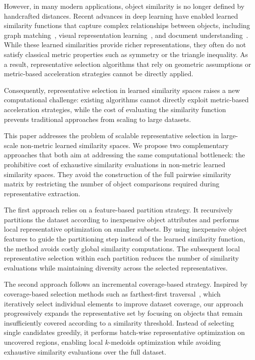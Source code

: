 \documentclass{ieeeaccess}
\begin{document}
However, in many modern applications, object similarity is no longer defined by handcrafted distances. Recent advances in deep learning have enabled learned similarity functions that capture complex relationships between objects, including graph matching~\cite{li2019graphmatchingnetworkslearning}, visual representation learning~\cite{chen2020simpleframeworkcontrastivelearning}, and document understanding~\cite{xu2020layoutlm}. While these learned similarities provide richer representations, they often do not satisfy classical metric properties such as symmetry or the triangle inequality. As a result, representative selection algorithms that rely on geometric assumptions or metric-based acceleration strategies cannot be directly applied.

Consequently, representative selection in learned similarity spaces raises a new computational challenge: existing algorithms cannot directly exploit metric-based acceleration strategies, while the cost of evaluating the similarity function prevents traditional approaches from scaling to large datasets.


This paper addresses the problem of scalable representative selection in large-scale non-metric learned similarity spaces. We propose two complementary approaches that both aim at addressing the same computational bottleneck: the prohibitive cost of exhaustive similarity evaluations in non-metric learned similarity spaces. They avoid the construction of the full pairwise similarity matrix by restricting the number of object comparisons required during representative extraction.

The first approach relies on a feature-based partition strategy. It recursively partitions the dataset according to inexpensive object attributes and performs local representative optimization on smaller subsets. By using inexpensive object features to guide the partitioning step instead of the learned similarity function, the method avoids costly global similarity computations. The subsequent local representative selection within each partition reduces the number of similarity evaluations while maintaining diversity across the selected representatives.

The second approach follows an incremental coverage-based strategy. Inspired by coverage-based selection methods such as farthest-first traversal~\cite{gonzalez1985clustering}, which iteratively select individual elements to improve dataset coverage, our approach progressively expands the representative set by focusing on objects that remain insufficiently covered according to a similarity threshold. Instead of selecting single candidates greedily, it performs batch-wise representative optimization on uncovered regions, enabling local $k$-medoids optimization while avoiding exhaustive similarity evaluations over the full dataset.
\end{document}
